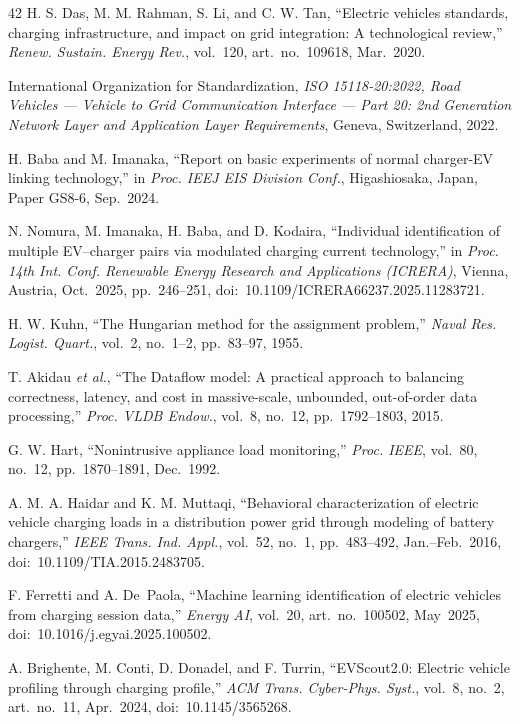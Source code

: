 \documentclass{ieeeaccess}
\newif\ifhighlight \highlightfalse
\DeclareRobustCommand{\revised}[1]{\ifhighlight{\color{blue}#1}\else{\color{.}#1}\fi}
\begin{document}
\begin{thebibliography}{42}
         H. S. Das, M. M. Rahman, S. Li, and C. W. Tan, ``Electric vehicles standards, charging infrastructure, and impact on grid integration: A technological review,'' \textit{Renew. Sustain. Energy Rev.}, vol.~120, art.~no.~109618, Mar.~2020.

         International Organization for Standardization, \textit{ISO 15118-20:2022, Road Vehicles --- Vehicle to Grid Communication Interface --- Part 20: \revised{2nd Generation Network Layer and Application Layer Requirements}}, Geneva, Switzerland, 2022.

         H. Baba and M. Imanaka, ``Report on basic experiments of normal charger-EV linking technology,'' in \textit{Proc. IEEJ EIS Division Conf.}, \revised{Higashiosaka, Japan,} Paper GS8-6, \revised{Sep.}~2024.

         N. Nomura, M. Imanaka, H. Baba, and D. Kodaira, ``Individual identification of multiple EV--charger pairs via modulated charging current technology,'' in \textit{Proc. 14th Int. Conf. Renewable Energy Research and Applications (ICRERA)}, Vienna, Austria, Oct.~2025, pp.~246--251, doi:~10.1109/ICRERA66237.2025.11283721.

         H. W. Kuhn, ``The Hungarian method for the assignment problem,'' \textit{Naval Res. Logist. Quart.}, vol.~2, no.~1--2, pp.~83--97, 1955.

         T. Akidau \textit{et al.}, ``The Dataflow model: A practical approach to balancing correctness, latency, and cost in massive-scale, unbounded, out-of-order data processing,'' \textit{Proc. VLDB Endow.}, vol.~8, no.~12, pp.~1792--1803, 2015.

         G. W. Hart, ``Nonintrusive appliance load monitoring,'' \textit{Proc. IEEE}, vol.~80, no.~12, pp.~1870--1891, Dec.~1992.

         A. M. A. Haidar and K. M. Muttaqi, ``Behavioral characterization of electric vehicle charging loads in a distribution power grid through modeling of battery chargers,'' \textit{IEEE Trans. Ind. Appl.}, vol.~52, no.~1, pp.~483--492, Jan.--Feb.~2016, doi:~10.1109/TIA.2015.2483705.

         F. Ferretti and A. De~Paola, ``Machine learning identification of electric vehicles from charging session data,'' \textit{Energy AI}, vol.~20, art.~no.~100502, May~2025, doi:~10.1016/j.egyai.2025.100502.

         A. Brighente, M. Conti, D. Donadel, and F. Turrin, ``EVScout2.0: Electric vehicle profiling through charging profile,'' \textit{ACM Trans. Cyber-Phys. Syst.}, vol.~8, no.~2, art.~no.~11, Apr.~2024, doi:~10.1145/3565268.


\end{thebibliography}
\end{document}
